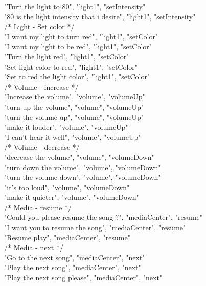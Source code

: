 \documentclass[twoside]{supsistudent}
\begin{document}
\begin{appendices}
        "Turn the light to 80", "light1", "setIntensity"\\
        "80 is the light intensity that i desire", "light1", "setIntensity"\\
        /*
        Light - Set color
         */\\
        "I want my light to turn red", "light1", "setColor"\\
        "I want my light to be red", "light1", "setColor"\\
        "Turn the light red", "light1", "setColor"\\
        "Set light color to red", "light1", "setColor"\\
        "Set to red the light color", "light1", "setColor"\\
        /*
        Volume - increase
         */\\
        "Increase the volume", "volume", "volumeUp"\\
        "turn up the volume", "volume", "volumeUp"\\
        "turn the volume up", "volume", "volumeUp"\\
        "make it louder", "volume", "volumeUp"\\
        "I can’t hear it well", "volume", "volumeUp"\\
        /*
        Volume - decrease
         */\\
        "decrease the volume", "volume", "volumeDown"\\
        "turn down the volume", "volume", "volumeDown"\\
        "turn the volume down", "volume", "volumeDown"\\
        "it’s too loud", "volume", "volumeDown"\\
        "make it quieter", "volume", "volumeDown"\\
        /*
        Media - resume
         */\\
        "Could you please resume the song ?", "mediaCenter", "resume"\\
        "I want you to resume the song", "mediaCenter", "resume"\\
        "Resume play", "mediaCenter", "resume"\\
        /*
        Media - next
         */\\
        "Go to the next song", "mediaCenter", "next"\\
        "Play the next song", "mediaCenter", "next"\\
        "Play the next song please", "mediaCenter", "next"\\

\end{appendices}
\end{document}
